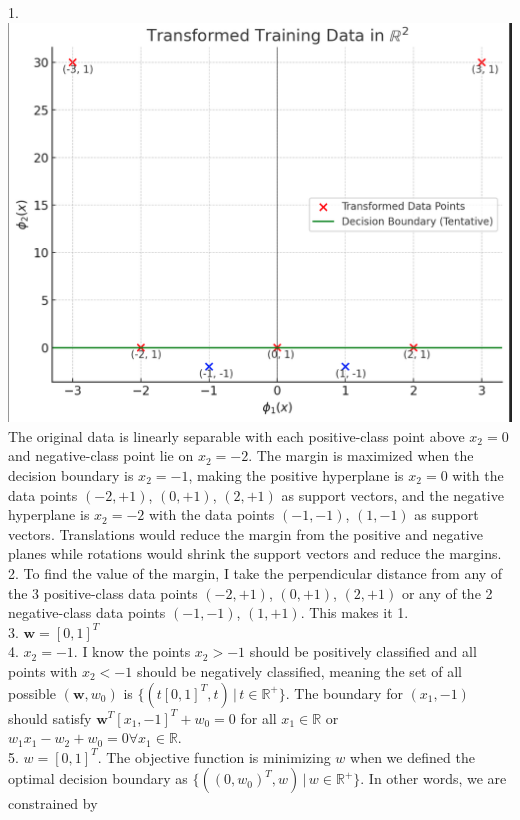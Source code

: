 \documentclass[submit]{harvardml}
\begin{document}
1. \includegraphics[width=0.5\linewidth]{hw4/11.png}\\ The original data is linearly separable with each positive-class point above $x_2 = 0$ and negative-class point lie on $x_2 = -2$. The margin is maximized when the decision boundary is $x_2 = -1$, making the positive hyperplane is $x_2 = 0$ with the data points $(-2, +1)$, $(0, +1)$, $(2, +1)$ as support vectors, and the negative hyperplane is $x_2 = -2$ with the data points $(-1, -1)$, $(1, -1)$ as support vectors. Translations would reduce the margin from the positive and negative planes while rotations would shrink the support vectors and reduce the margins. \\
2. To find the value of the margin, I take the perpendicular distance from any of the 3 positive-class data points $(-2, +1)$, $(0, +1)$, $(2, +1)$ or any of the 2 negative-class data points $(-1, -1)$, $(1, +1)$. This makes it 1. \\
3. $\mathbf{w} = [0, 1]^T$\\
4. $x_2 = -1$. I know the points $x_2 > -1$ should be positively classified and all points with $x_2 < -1$ should be negatively classified, meaning the set of all possible $(\mathbf{w}, w_0)$ is $\{ (t[0, 1]^T, t) \,|\, t \in \mathbb{R}^+ \}$. The boundary for $(x_1, -1)$  should satisfy $\mathbf{w}^T[x_1, -1]^T + w_0 = 0$ for all $x_1 \in \mathbb{R}$ or $w_1x_1 - w_2 + w_0 = 0\forall x_1 \in \mathbb{R}$.  \\
5. \(w = [0, 1]^T\). The objective function is minimizing \(w\) when we defined the optimal decision boundary as \(\{((0, w_0)^T, w) \,|\, w \in \mathbb{R}^+\}\). In other words, we are constrained by 
\end{document}

